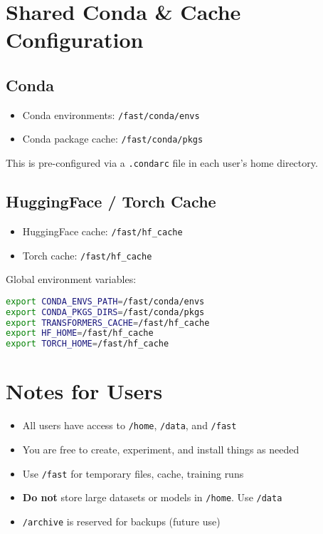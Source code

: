 \documentclass{article}
\begin{document}
\section*{Shared Conda \& Cache Configuration}
\subsection*{Conda}
\begin{itemize}
  \item Conda environments: \texttt{/fast/conda/envs}
  \item Conda package cache: \texttt{/fast/conda/pkgs}
\end{itemize}
This is pre-configured via a \texttt{.condarc} file in each user's home directory.

\subsection*{HuggingFace / Torch Cache}
\begin{itemize}
  \item HuggingFace cache: \texttt{/fast/hf\_cache}
  \item Torch cache: \texttt{/fast/hf\_cache}
\end{itemize}

Global environment variables:
\begin{lstlisting}[language=bash]
export CONDA_ENVS_PATH=/fast/conda/envs
export CONDA_PKGS_DIRS=/fast/conda/pkgs
export TRANSFORMERS_CACHE=/fast/hf_cache
export HF_HOME=/fast/hf_cache
export TORCH_HOME=/fast/hf_cache
\end{lstlisting}

\section*{Notes for Users}
\begin{itemize}
  \item All users have access to \texttt{/home}, \texttt{/data}, and \texttt{/fast}
  \item You are free to create, experiment, and install things as needed
  \item Use \texttt{/fast} for temporary files, cache, training runs
  \item \textbf{Do not} store large datasets or models in \texttt{/home}. Use \texttt{/data}
  \item \texttt{/archive} is reserved for backups (future use)
\end{itemize}
\end{document}
